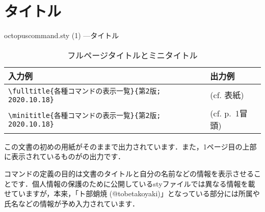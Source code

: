 \documentclass[uplatex]{jsreport}
\begin{document}
\section{タイトル}
\begin{insertcode}[firstnumber=5]{octopuscommand.sty (1) ---タイトル}
\newcommand{\minititle}[2]{%
  \begin{center}{\LARGE \textbf{#1}}\par #2 \end{center}
  \begin{flushright}{ト部蛸焼 (@tobetakoyaki)\par}\end{flushright}\par
}
\newcommand{\fulltitle}[2]{%
  \vspace*{13\baselineskip}
  \begin{center} \textbf{\HUGE #1}\par\vspace{0.5\baselineskip}{\Large #2} \end{center}
  \vfill
  \begin{flushright}{\LARGE ト部蛸焼 (@tobetakoyaki)\par}\end{flushright}
  \thispagestyle{empty}
  \setcounter{page}{0}
  \newpage
}
\end{insertcode}
\par
\begin{table}[htbp]
  \centering
  \caption{フルページタイトルとミニタイトル}
  \label{table:1.title}
  \begin{tabular}{ll}\hline
    入力例 & 出力例 \\ \hline
    \verb|\fulltitle{各種コマンドの表示一覧}{第2版; 2020.10.18}| & (cf. 表紙) \\
    \verb|\minititle{各種コマンドの表示一覧}{第2版; 2020.10.18}| & (cf. p.~1冒頭) \\ \hline
  \end{tabular}
\end{table}
この文書の初めの用紙がそのままで出力されています．また，1ページ目の上部に表示されているものがの出力です．\par
コマンドの定義の目的は文書のタイトルと自分の名前などの情報を表示させることです．個人情報の保護のために公開しているstyファイルでは異なる情報を載せていますが，本来，「ト部蛸焼 (@tobetakoyaki)」となっている部分には所属や氏名などの情報が予め入力されています．\par
\end{document}
